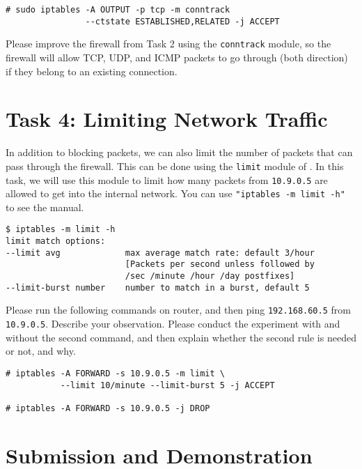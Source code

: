 \begin{lstlisting}
# sudo iptables -A OUTPUT -p tcp -m conntrack
                --ctstate ESTABLISHED,RELATED -j ACCEPT
\end{lstlisting}


Please improve the firewall from Task 2 using the \texttt{conntrack} module, 
so the firewall will allow TCP, UDP, and ICMP packets to go through (both direction)
if they belong to an existing connection. 



\section{Task 4: Limiting Network Traffic}

In addition to blocking packets, we can also 
limit the number of packets that can pass through the firewall. 
This can be done using the \texttt{limit} module of \iptables.
In this task, we will use this module to limit how many packets 
from \texttt{10.9.0.5} are allowed to get into the internal network. 
You can use \texttt{"iptables -m limit -h"} to see the manual.  

\begin{lstlisting}
$ iptables -m limit -h
limit match options:
--limit avg             max average match rate: default 3/hour
                        [Packets per second unless followed by
                        /sec /minute /hour /day postfixes]
--limit-burst number    number to match in a burst, default 5
\end{lstlisting}
 

Please run the following commands on router, and then
ping \texttt{192.168.60.5} from \texttt{10.9.0.5}.  
Describe your observation. 
Please conduct the experiment with and without the second command, 
and then explain whether the second rule is needed or not, and why.

\begin{lstlisting}
# iptables -A FORWARD -s 10.9.0.5 -m limit \
           --limit 10/minute --limit-burst 5 -j ACCEPT

# iptables -A FORWARD -s 10.9.0.5 -j DROP
\end{lstlisting}




\section{Submission and Demonstration}









